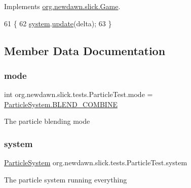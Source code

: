 Implements \mbox{\hyperlink{interfaceorg_1_1newdawn_1_1slick_1_1_game_ab07b2e9463ee4631620dde0de25bdee8}{org.\+newdawn.\+slick.\+Game}}.


\begin{DoxyCode}
61                                                            \{
62         \mbox{\hyperlink{classorg_1_1newdawn_1_1slick_1_1tests_1_1_particle_test_a6daed8a7245faff147f4e66159df9c0d}{system}}.\mbox{\hyperlink{classorg_1_1newdawn_1_1slick_1_1particles_1_1_particle_system_a1331df1f902b7c6777b19dc798fbba80}{update}}(delta);
63     \}
\end{DoxyCode}


\subsection{Member Data Documentation}
\mbox{\label{classorg_1_1newdawn_1_1slick_1_1tests_1_1_particle_test_a3672703408b8d6f2d94e63765339d4a8}} 
\subsubsection{\texorpdfstring{mode}{mode}}
{\footnotesize\ttfamily int org.\+newdawn.\+slick.\+tests.\+Particle\+Test.\+mode = \mbox{\hyperlink{classorg_1_1newdawn_1_1slick_1_1particles_1_1_particle_system_a6e5a43dd58a794750f52fa0df8282e75}{Particle\+System.\+B\+L\+E\+N\+D\+\_\+\+C\+O\+M\+B\+I\+NE}}\hspace{0.3cm}{\ttfamily [private]}}

The particle blending mode \mbox{\label{classorg_1_1newdawn_1_1slick_1_1tests_1_1_particle_test_a6daed8a7245faff147f4e66159df9c0d}} 
\subsubsection{\texorpdfstring{system}{system}}
{\footnotesize\ttfamily \mbox{\hyperlink{classorg_1_1newdawn_1_1slick_1_1particles_1_1_particle_system}{Particle\+System}} org.\+newdawn.\+slick.\+tests.\+Particle\+Test.\+system\hspace{0.3cm}{\ttfamily [private]}}

The particle system running everything 